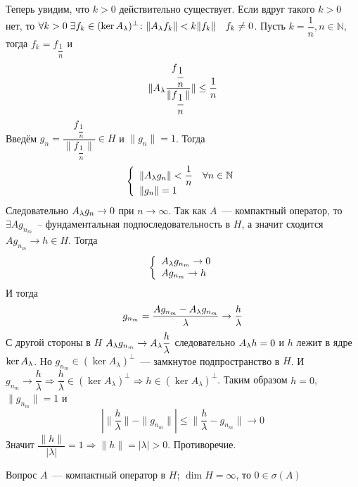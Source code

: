 \documentclass[14pt]{extarticle}
\begin{document}
\begin{Proof}
    Теперь увидим, что $k > 0$ действительно существует.
    Если вдруг такого $k > 0$ нет, то
    $\forall k > 0\; \exists f_k \in (\ker A_\lambda)^\perp\colon \|\Al f_k\| 
    < k \|f_k\|\quad f_k \ne 0$.
    Пусть $k = \dfrac{1}{n}, n \in \mathbb N$, тогда $f_k = f_{\dfrac{1}{n}}$ и
    $$
    \|\Al \dfrac{f_{\dfrac{1}{n}}}{\|f_{\dfrac{1}{n}}\|}\| \le \dfrac{1}{n}
    $$
    Введём $g_n = \dfrac{f_{\dfrac{1}{n}}}{\|f_{\dfrac{1}{n}}\|} \in H$ и $\|g_n
    \| = 1$.
    Тогда
    $$
    \left\{
        \begin{array}{l}
            \|{\Al} g_n\| < \dfrac{1}{n} \quad \forall n \in \mathbb N\\
            \|g_n\| = 1
        \end{array}
    \right.
    $$
    Следовательно $\Al g_n \to 0$ при $n \to \infty$.
    Так как $A$~--- компактный оператор, то $\exists A g_{n_m}$~--
    фундаментальная подпоследовательность в $H$, а значит сходится $Ag_{n_m}
    \to h \in H$.
    Тогда
    $$
    \left\{
        \begin{array}{l}
            {\Al} g_{n_m} \to 0\\
            A g_{n_m} \to h
        \end{array}
    \right.
    $$
    И тогда
    $$
    g_{n_m} = \dfrac{A g_{n_m} - \Al g_{n_m}}{\lambda} \to \dfrac{h}{\lambda}
    $$
    С другой стороны в $H$ $\Al g_{n_m} \to \Al \dfrac{h}{\lambda}$ 
    следовательно $\Al h = 0$ и $h$ лежит в ядре $\ker \Al$.
    Но $g_{n_m} \in (\ker A_\lambda)^\perp$~--- замкнутое подпространство в 
    $H$.
    И $g_{n_m} \to \dfrac{h}{\lambda} \Rightarrow \dfrac{h}{\lambda} \in 
    (\ker A_\lambda)^\perp \Rightarrow h \in (\ker A_\lambda)^\perp$.
    Таким образом $h = 0$, $\|g_{n_m}\| = 1$ и
    $$
    |\|\dfrac{h}{\lambda}\| - \|g_{n_m}\|| \le \|\dfrac{h}{\lambda} - g_{n_m}\|
    \to 0
    $$
    Значит $\dfrac{\|h\|}{|\lambda|} = 1 \Rightarrow  \|h\| = |\lambda| > 0$.
    Противоречие.
\end{Proof}
\begin{MathCl}{Вопрос}
    $A$~--- компактный оператор в $H$; $\dim H = \infty$, то $0 \in \sigma(A)
    $
\end{MathCl}
\end{document}
